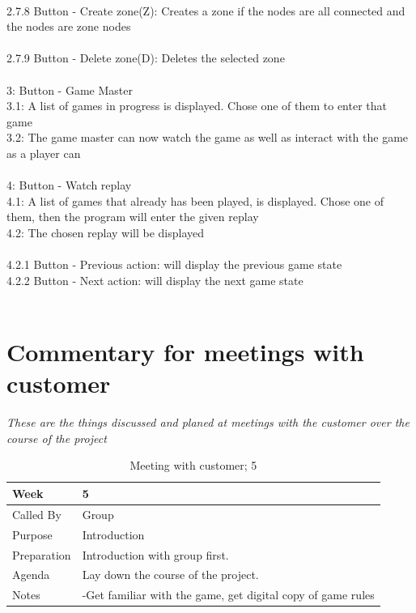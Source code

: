 \\
	2.7.8 Button - Create zone(Z): Creates a zone if the nodes are all connected and the nodes are zone nodes\\	
\\
	2.7.9 Button - Delete zone(D): Deletes the selected zone\\
\\
3: 	Button - Game Master\\
	3.1: A list of games in progress is displayed. Chose one of them to enter that game\\
	3.2: The game master can now watch the game as well as interact with the game as a player can\\
\\
	4: 	Button - Watch replay\\
	4.1: A list of games that already has been played, is displayed. Chose one of them, then the program will enter the given replay\\
	4.2: The chosen replay will be displayed\\
	\\
	4.2.1 Button - Previous action: will display the previous game state\\
	4.2.2 Button - Next action: will display the next game state\\
\\

\chapter{Commentary for meetings with customer}
%
\emph{These are the things discussed and planed at meetings with the customer over the course of the project}
%
%

{\footnotesize
\begin{table}[H]
\begin{tabular}{| p{5cm} | p{10cm} |}\hline
	\textbf{Week}	& \textbf{5} \\ \hline
	Called	By		& Group\\ \hline
	Purpose		& Introduction\\ \hline
	Preparation 
		& Introduction with group first. \\ 
		
	Agenda
		& Lay down the course of the project. \\

	Notes	& -Get familiar with the game, get digital copy of game rules\\ \hline
	
\end{tabular}


\caption{Meeting with customer; 5}
\label{fig:meeting_5}
\end{table}}



